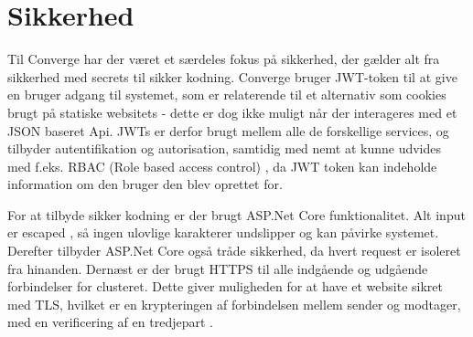 \chapter{Sikkerhed}

Til Converge har der været et særdeles fokus på sikkerhed, der gælder alt fra sikkerhed med secrets til sikker kodning. Converge bruger JWT-token\cite{JSON-Web-Token} til at give en bruger adgang til systemet, som er relaterende til et alternativ som cookies brugt på statiske websitets - dette er dog ikke muligt når der interageres med et JSON baseret Api. JWTs er derfor brugt mellem alle de forskellige services, og tilbyder autentifikation og autorisation, samtidig med nemt at kunne udvides med f.eks. RBAC (Role based access control) \cite[RBAC]{converge-terms}, da JWT token kan indeholde information om den bruger den blev oprettet for.

For at tilbyde sikker kodning er der brugt ASP.Net Core funktionalitet. Alt input er escaped \cite[Escaped]{converge-terms}, så ingen ulovlige karakterer undslipper og kan påvirke systemet. Derefter tilbyder ASP.Net Core også tråde sikkerhed, da hvert request er isoleret fra hinanden. Dernæst er der brugt HTTPS til alle indgående og udgående forbindelser for clusteret. Dette giver muligheden for at have et website sikret med TLS, hvilket er en krypteringen af forbindelsen mellem sender og modtager, med en verificering af en tredjepart \cite{security}.
